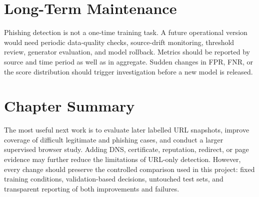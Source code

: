 \section{Long-Term Maintenance}

Phishing detection is not a one-time training task. A future operational
version would need periodic data-quality checks, source-drift monitoring,
threshold review, generator evaluation, and model rollback. Metrics should be
reported by source and time period as well as in aggregate. Sudden changes in
FPR, FNR, or the score distribution should trigger investigation before a new
model is released.

\section{Chapter Summary}

The most useful next work is to evaluate later labelled URL snapshots, improve
coverage of difficult legitimate and phishing cases, and conduct a larger
supervised browser study. Adding DNS, certificate, reputation, redirect, or
page evidence may further reduce the limitations of URL-only detection.
However, every change should preserve the controlled comparison used in this
project: fixed training conditions, validation-based decisions, untouched test
sets, and transparent reporting of both improvements and failures.
